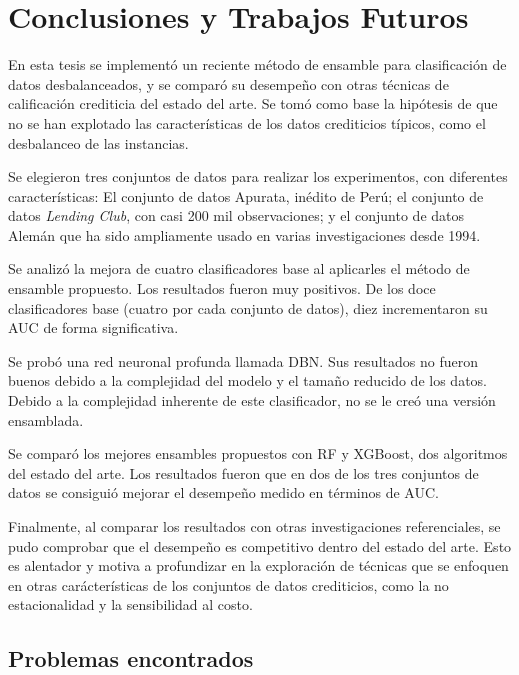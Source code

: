 \chapter{Conclusiones y Trabajos Futuros}\label{chap:conclusiones}


En esta tesis se implementó un reciente método de ensamble para clasificación de datos desbalanceados, y se comparó su desempeño con otras técnicas de calificación crediticia del estado del arte. Se tomó como base la hipótesis de que no se han explotado las características de los datos crediticios típicos, como el desbalanceo de las instancias.

Se elegieron tres conjuntos de datos para realizar los experimentos, con diferentes características: El conjunto de datos Apurata, inédito de Perú; el conjunto de datos \textit{Lending Club}, con casi 200 mil observaciones; y el conjunto de datos Alemán que ha sido ampliamente usado en varias investigaciones desde 1994.

Se analizó la mejora de cuatro clasificadores base al aplicarles el método de ensamble propuesto. Los resultados fueron muy positivos. De los doce clasificadores base (cuatro por cada conjunto de datos), diez incrementaron su \ac{AUC} de forma significativa.

Se probó una red neuronal profunda llamada \ac{DBN}. Sus resultados no fueron buenos debido a la complejidad del modelo y el tamaño reducido de los datos. Debido a la complejidad inherente de este clasificador, no se le creó una versión ensamblada.

Se comparó los mejores ensambles propuestos con \ac{RF} y \ac{XGBoost}, dos algoritmos del estado del arte. Los resultados fueron que en dos de los tres conjuntos de datos se consiguió mejorar el desempeño medido en términos de \ac{AUC}.

Finalmente, al comparar los resultados con otras investigaciones referenciales, se pudo comprobar que el desempeño es competitivo dentro del estado del arte. Esto es alentador y motiva a profundizar en la exploración de técnicas que se enfoquen en otras carácterísticas de los conjuntos de datos crediticios, como la no estacionalidad y la sensibilidad al costo.


\section{Problemas encontrados}

